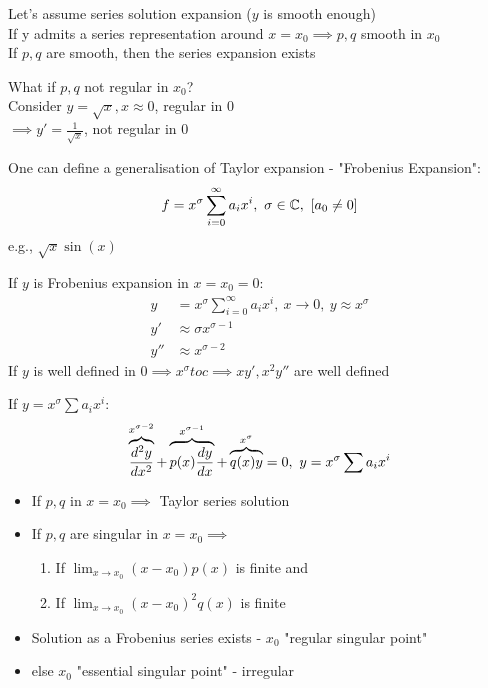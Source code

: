 \documentclass[Maths.tex]{subfiles}
\begin{document}
Let's assume series solution expansion ($y$ is smooth enough) \\
If y admits a series representation around $x = x_0 \implies p,q$ smooth in $x_0$ \\
If $p,q$ are smooth, then the series expansion exists

What if $p,q$ not regular in $x_0$? \\
Consider $y = \sqrt{x}, x \approx 0$, regular in $0$ \\
$\implies y' = \frac{1}{\sqrt{x}}$, not regular in $0$

One can define a generalisation of Taylor expansion - "Frobenius Expansion":
\begin{equation}
    f = x^\sigma \sum_{i=0}^\infty a_i x^i, ~ \sigma \in \mathbb{C}, ~ [a_0 \neq 0]
\end{equation}
e.g., $\sqrt{x}\sin(x)$

If $y$ is Frobenius expansion in $x = x_0 = 0$:
\begin{align}
    y &= x^\sigma \sum_{i=0}^\infty a_ix^i, ~ x \to 0, ~ y \approx x^\sigma \\
    y' &\approx \sigma x^{\sigma - 1} \\
    y'' &\approx x^{\sigma-2}
\end{align}
If $y$ is well defined in $0 \implies x^\sigma to c \implies xy', x^2y''$ are well defined

If $y = x^\sigma \sum a_ix^i$:
\begin{equation}
    \overbrace{\frac{d^2 y}{dx^2}}^{x^{\sigma-2}} + \overbrace{p(x)\frac{dy}{dx}}^{x^{\sigma-1}} + \overbrace{q(x)y}^{x^\sigma} = 0, ~ y = x^\sigma \sum a_ix^i
\end{equation}
\newpage
\begin{itemize}
    \item If $p,q$ in $x = x_0 \implies$ Taylor series solution
    \item If $p,q$ are singular in $x = x_0 \implies$
    \begin{enumerate}
        \item If $\lim_{x\to x_0} (x-x_0)p(x)$ is finite and
        \item If $\lim_{x \to x_0} (x-x_0)^2q(x)$ is finite
    \end{enumerate}
    \item Solution as a Frobenius series exists - $x_0$ "regular singular point"
    \item else $x_0$ "essential singular point" - irregular
\end{itemize}
\end{document}
